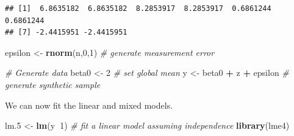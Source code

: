 \documentclass[]{book}
\newenvironment{Shaded}{\begin{snugshade}}{\end{snugshade}}
\newcommand{\CommentTok}[1]{\textcolor[rgb]{0.56,0.35,0.01}{\textit{#1}}}
\newcommand{\DataTypeTok}[1]{\textcolor[rgb]{0.13,0.29,0.53}{#1}}
\newcommand{\DecValTok}[1]{\textcolor[rgb]{0.00,0.00,0.81}{#1}}
\newcommand{\FloatTok}[1]{\textcolor[rgb]{0.00,0.00,0.81}{#1}}
\newcommand{\KeywordTok}[1]{\textcolor[rgb]{0.13,0.29,0.53}{\textbf{#1}}}
\newcommand{\NormalTok}[1]{#1}
\newcommand{\OperatorTok}[1]{\textcolor[rgb]{0.81,0.36,0.00}{\textbf{#1}}}
\newcommand{\StringTok}[1]{\textcolor[rgb]{0.31,0.60,0.02}{#1}}
\theoremstyle{definition}
\theoremstyle{definition}
\theoremstyle{definition}
\theoremstyle{remark}
\begin{document}
\begin{Shaded}
\end{Shaded}

\begin{verbatim}
## [1]  6.8635182  6.8635182  8.2853917  8.2853917  0.6861244  0.6861244
## [7] -2.4415951 -2.4415951
\end{verbatim}

\begin{Shaded}
\begin{Highlighting}[]
\NormalTok{epsilon <-}\StringTok{ }\KeywordTok{rnorm}\NormalTok{(n,}\DecValTok{0}\NormalTok{,}\DecValTok{1}\NormalTok{) }\CommentTok{# generate measurement error}

\CommentTok{# Generate data}
\NormalTok{beta0 <-}\StringTok{ }\DecValTok{2} \CommentTok{# set global mean}
\NormalTok{y <-}\StringTok{ }\NormalTok{beta0 }\OperatorTok{+}\StringTok{ }\NormalTok{z }\OperatorTok{+}\StringTok{ }\NormalTok{epsilon }\CommentTok{# generate synthetic sample}
\end{Highlighting}
\end{Shaded}

We can now fit the linear and mixed models.

\begin{Shaded}
\begin{Highlighting}[]
\NormalTok{lm}\FloatTok{.5}\NormalTok{ <-}\StringTok{ }\KeywordTok{lm}\NormalTok{(y}\OperatorTok{~}\DecValTok{1}\NormalTok{)  }\CommentTok{# fit a linear model assuming independence}
\KeywordTok{library}\NormalTok{(lme4)}
\end{Highlighting}
\end{Shaded}
\end{document}
